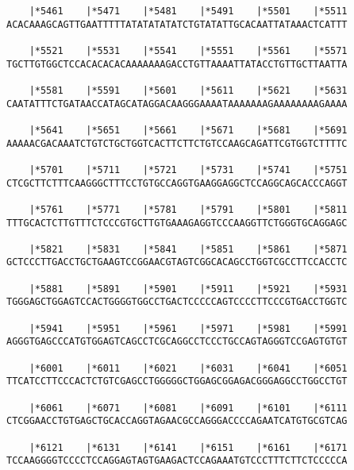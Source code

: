 \documentclass{article}
\begin{document}
\begin{Verbatim}
    |*5461    |*5471    |*5481    |*5491    |*5501    |*5511
ACACAAAGCAGTTGAATTTTTATATATATATCTGTATATTGCACAATTATAAACTCATTT
                                                            
    |*5521    |*5531    |*5541    |*5551    |*5561    |*5571
TGCTTGTGGCTCCACACACACAAAAAAAGACCTGTTAAAATTATACCTGTTGCTTAATTA
                                                            
    |*5581    |*5591    |*5601    |*5611    |*5621    |*5631
CAATATTTCTGATAACCATAGCATAGGACAAGGGAAAATAAAAAAAGAAAAAAAAGAAAA
                                                            
    |*5641    |*5651    |*5661    |*5671    |*5681    |*5691
AAAAACGACAAATCTGTCTGCTGGTCACTTCTTCTGTCCAAGCAGATTCGTGGTCTTTTC
                                                            
    |*5701    |*5711    |*5721    |*5731    |*5741    |*5751
CTCGCTTCTTTCAAGGGCTTTCCTGTGCCAGGTGAAGGAGGCTCCAGGCAGCACCCAGGT
                                                            
    |*5761    |*5771    |*5781    |*5791    |*5801    |*5811
TTTGCACTCTTGTTTCTCCCGTGCTTGTGAAAGAGGTCCCAAGGTTCTGGGTGCAGGAGC
                                                            
    |*5821    |*5831    |*5841    |*5851    |*5861    |*5871
GCTCCCTTGACCTGCTGAAGTCCGGAACGTAGTCGGCACAGCCTGGTCGCCTTCCACCTC
                                                            
    |*5881    |*5891    |*5901    |*5911    |*5921    |*5931
TGGGAGCTGGAGTCCACTGGGGTGGCCTGACTCCCCCAGTCCCCTTCCCGTGACCTGGTC
                                                            
    |*5941    |*5951    |*5961    |*5971    |*5981    |*5991
AGGGTGAGCCCATGTGGAGTCAGCCTCGCAGGCCTCCCTGCCAGTAGGGTCCGAGTGTGT
                                                            
    |*6001    |*6011    |*6021    |*6031    |*6041    |*6051
TTCATCCTTCCCACTCTGTCGAGCCTGGGGGCTGGAGCGGAGACGGGAGGCCTGGCCTGT
                                                            
    |*6061    |*6071    |*6081    |*6091    |*6101    |*6111
CTCGGAACCTGTGAGCTGCACCAGGTAGAACGCCAGGGACCCCAGAATCATGTGCGTCAG
                                                            
    |*6121    |*6131    |*6141    |*6151    |*6161    |*6171
TCCAAGGGGTCCCCTCCAGGAGTAGTGAAGACTCCAGAAATGTCCCTTTCTTCTCCCCCA
                                                            

\end{Verbatim}
\end{document}
